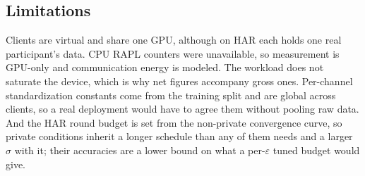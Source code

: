 \subsection{Limitations}

Clients are virtual and share one GPU, although on HAR each holds one real
participant's data. CPU RAPL counters were unavailable, so measurement is
GPU-only and communication energy is modeled. The workload does not saturate
the device, which is why net figures accompany gross ones. Per-channel
standardization constants come from the training split and are global across
clients, so a real deployment would have to agree them without pooling raw
data. And the HAR round budget is set from the non-private convergence curve,
so private conditions inherit a longer schedule than any of them needs and a
larger $\sigma$ with it; their accuracies are a lower bound on what a
per-$\varepsilon$ tuned budget would give.